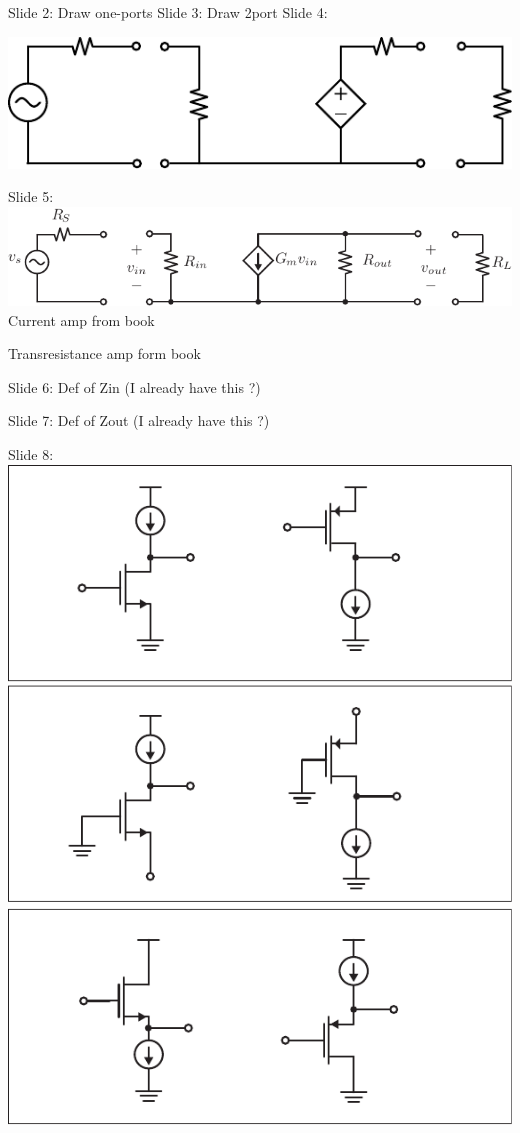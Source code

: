Slide 2:  Draw one-ports
Slide 3:  Draw 2port
Slide 4:

\includegraphics[width=.75\columnwidth]{vamp}

Slide 5:
\includegraphics[width=.75\columnwidth]{gmamp}
Current amp from book

Transresistance amp form book


Slide 6:
Def of Zin (I already have this ?)

Slide 7:
Def of Zout (I already have this ?)

Slide 8:
\includegraphics[width=.75\columnwidth]{ampchart}


